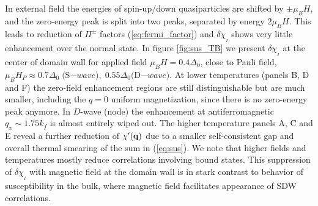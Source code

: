\documentclass[prb,aps,showpacs,amsmath,twocolumn,10pt]{revtex4-1}
\begin{document}
In external field the energies of spin-up/down quasiparticles are shifted by $\pm \mu_B H$, 
and the zero-energy peak is split into two peaks, separated by energy $2\mu_B H$. This leads to 
reduction of $\Pi^{\pm}$ factors (\ref{eq:fermi_factor}) 
and $\delta\chi_{{}_I}$ shows very little enhancement over the normal state. 
In figure \ref{fig:sus_TB} we present $\delta\chi_{{}_I}$ at the center of domain wall for applied field
$\mu_B H = 0.4\Delta_0$, close to Pauli field, $\mu_B H_P \approx 0.7 \Delta_0\; ($S$-wave),\; 0.55\Delta_0 ($D$-wave)$. 
At lower temperatures (panels B, D and F) the zero-field enhancement regions 
are still distinguishable but are much smaller, including the $q=0$ uniform magnetization, since there is no 
zero-energy peak anymore. In $D$-wave (node) the enhancement at antiferromagnetic $q_x \sim 1.75 k_f$ is 
almost entirely wiped out. 
The higher temperature panels A, C and E
reveal a further reduction of $\chi'({\bf q})$ due to a smaller self-consistent gap
and overall thermal smearing of the sum in (\ref{eq:sus}).   
We note that higher fields and temperatures mostly reduce correlations involving bound states. 
This suppression of $\delta\chi_{{}_I}$ with magnetic field at the domain wall is in stark contrast 
to behavior of susceptibility in the bulk, where magnetic field facilitates appearance of SDW 
correlations.\cite{Ikeda:2010eo,sc_afm_kato,Rosemeyer2014} 
\end{document}
